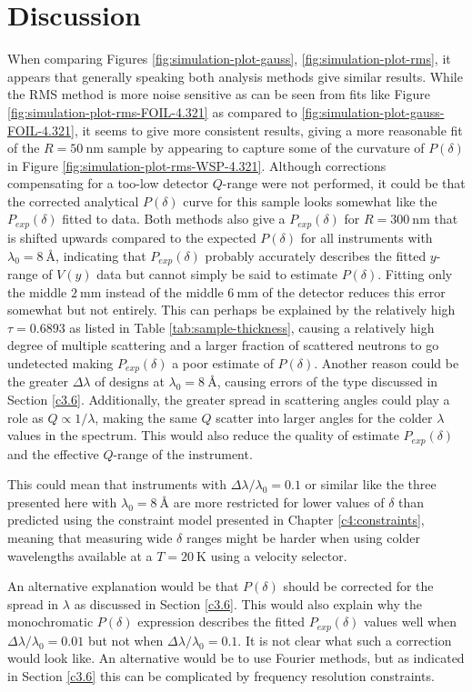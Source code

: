 \section{Discussion}
When comparing Figures \ref{fig:simulation-plot-gauss}, \ref{fig:simulation-plot-rms}, it appears that generally speaking both analysis methods give similar results. While the RMS method is more noise sensitive as can be seen from fits like Figure \ref{fig:simulation-plot-rms-FOIL-4.321} as compared to \ref{fig:simulation-plot-gauss-FOIL-4.321}, it seems to give more consistent results, giving a more reasonable fit of the $R=\SI{50}{\nano\meter}$ sample by appearing to capture some of the curvature of $P(\delta)$ in Figure \ref{fig:simulation-plot-rms-WSP-4.321}. Although corrections compensating for a too-low detector $Q$-range \cite{kusmin2017} were not performed, it could be that the corrected analytical $P(\delta)$ curve for this sample looks somewhat like the $P_{exp}(\delta)$ fitted to data. Both methods also give a $P_{exp}(\delta)$ for $R = \SI{300}{\nano\meter}$ that is shifted upwards compared to the expected $P(\delta)$ for all instruments with $\lambda_0 = \SI{8}{\angstrom}$, indicating that $P_{exp}(\delta)$ probably accurately describes the fitted $y$-range of $V(y)$ data but cannot simply be said to estimate $P(\delta)$. Fitting only the middle $\SI{2}{\milli\meter}$ instead of the middle $\SI{6}{\milli\meter}$ of the detector reduces this error somewhat but not entirely. This can perhaps be explained by the relatively high $\tau = 0.6893$ as listed in Table \ref{tab:sample-thickness}, causing a relatively high degree of multiple scattering and a larger fraction of scattered neutrons to go undetected making $P_{exp}(\delta)$ a poor estimate of $P(\delta)$. Another reason could be the greater $\Delta\lambda$ of designs at $\lambda_0 = \SI{8}{\angstrom}$, causing errors of the type discussed in Section \ref{c3.6}. Additionally, the greater spread in scattering angles could play a role as $Q\propto 1/\lambda$, making the same $Q$ scatter into larger angles for the colder $\lambda$ values in the spectrum. This would also reduce the quality of estimate $P_{exp}(\delta)$ and the effective $Q$-range of the instrument.

This could mean that instruments with $\Delta\lambda/\lambda_0 = 0.1$ or similar like the three presented here with $\lambda_0 = \SI{8}{\angstrom}$ are more restricted for lower values of $\delta$ than predicted using the constraint model presented in Chapter \ref{c4:constraints}, meaning that measuring wide $\delta$ ranges might be harder when using colder wavelengths available at a $T=\SI{20}{\kelvin}$ using a velocity selector. 

An alternative explanation would be that $P(\delta)$ should be corrected for the spread in $\lambda$ as discussed in Section \ref{c3.6}. This would also explain why the monochromatic $P(\delta)$ expression describes the fitted $P_{exp}(\delta)$ values well when $\Delta\lambda/\lambda_0 = 0.01$ but not when $\Delta\lambda/\lambda_0 = 0.1$. It is not clear what such a correction would look like. An alternative would be to use Fourier methods, but as indicated in Section \ref{c3.6} this can be complicated by frequency resolution constraints.